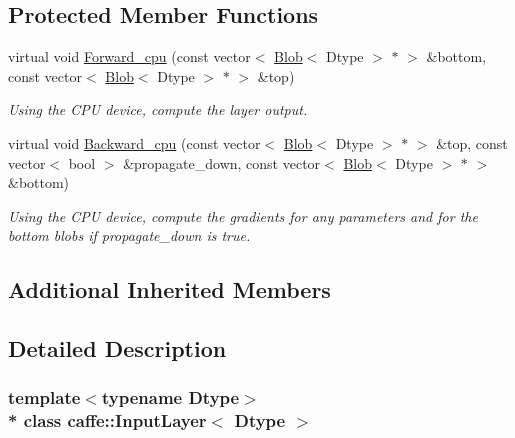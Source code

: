 \subsection*{Protected Member Functions}
\begin{DoxyCompactItemize}
\item 
virtual void \hyperlink{classcaffe_1_1InputLayer_aaa8f0afa0e900adb9e05153d7b728345}{Forward\+\_\+cpu} (const vector$<$ \hyperlink{classcaffe_1_1Blob}{Blob}$<$ Dtype $>$ $\ast$ $>$ \&bottom, const vector$<$ \hyperlink{classcaffe_1_1Blob}{Blob}$<$ Dtype $>$ $\ast$ $>$ \&top)\hypertarget{classcaffe_1_1InputLayer_aaa8f0afa0e900adb9e05153d7b728345}{}\label{classcaffe_1_1InputLayer_aaa8f0afa0e900adb9e05153d7b728345}

\begin{DoxyCompactList}\small\item\em Using the C\+PU device, compute the layer output. \end{DoxyCompactList}\item 
virtual void \hyperlink{classcaffe_1_1InputLayer_a0a53bdde1a21d5f10319054ca0e9839d}{Backward\+\_\+cpu} (const vector$<$ \hyperlink{classcaffe_1_1Blob}{Blob}$<$ Dtype $>$ $\ast$ $>$ \&top, const vector$<$ bool $>$ \&propagate\+\_\+down, const vector$<$ \hyperlink{classcaffe_1_1Blob}{Blob}$<$ Dtype $>$ $\ast$ $>$ \&bottom)\hypertarget{classcaffe_1_1InputLayer_a0a53bdde1a21d5f10319054ca0e9839d}{}\label{classcaffe_1_1InputLayer_a0a53bdde1a21d5f10319054ca0e9839d}

\begin{DoxyCompactList}\small\item\em Using the C\+PU device, compute the gradients for any parameters and for the bottom blobs if propagate\+\_\+down is true. \end{DoxyCompactList}\end{DoxyCompactItemize}
\subsection*{Additional Inherited Members}


\subsection{Detailed Description}
\subsubsection*{template$<$typename Dtype$>$\\*
class caffe\+::\+Input\+Layer$<$ Dtype $>$}

